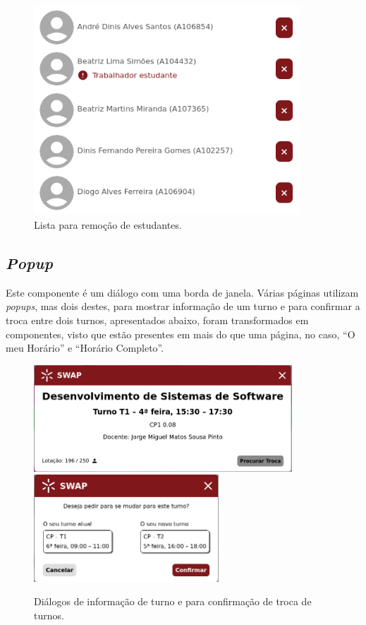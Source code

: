 \documentclass[12pt, a4paper]{article}
\begin{document}
\begin{figure}[H]
    \centering
    \includegraphics[width=10cm]{res/components/student-list.png}
    \caption{Lista para remoção de estudantes.}
    \label{student-list}
\end{figure}

\subsection{\emph{Popup}}

Este componente é um diálogo com uma borda de janela. Várias páginas utilizam \emph{popups}, mas
dois destes, para mostrar informação de um turno e para confirmar a troca entre dois turnos,
apresentados abaixo, foram transformados em componentes, visto que estão presentes em mais do que
uma página, no caso, ``O meu Horário'' e ``Horário Completo''.

\begin{figure}[H]
    \centering
    \includegraphics[height=4cm]{res/components/popup-1.png}
    \includegraphics[height=4cm]{res/components/popup-2.png}
    \caption{Diálogos de informação de turno e para confirmação de troca de turnos.}
    \label{popup}
\end{figure}
\end{document}
